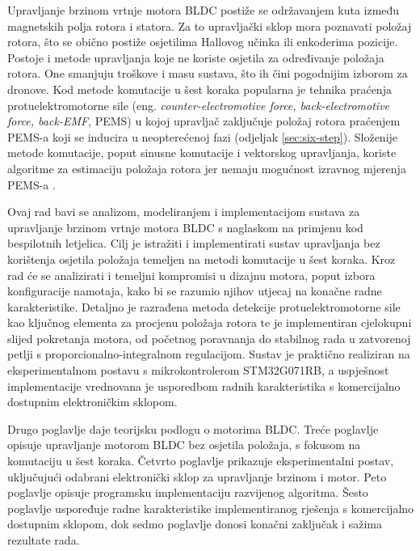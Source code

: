 \documentclass[diplomskirad]{fer}
\begin{document}
Upravljanje brzinom vrtnje motora BLDC postiže se održavanjem kuta između
magnetskih polja rotora i statora. Za to upravljački sklop mora poznavati
položaj rotora, što se obično postiže osjetilima Hallovog učinka ili enkoderima
pozicije. Postoje i metode upravljanja koje ne koriste osjetila za određivanje
položaja rotora. One smanjuju troškove i masu sustava, što ih čini pogodnijim
izborom za dronove. Kod metode komutacije u šest koraka popularna je tehnika
praćenja protuelektromotorne sile (eng. \textit {counter-electromotive force,
	back-electromotive force, back-EMF}, PEMS) u kojoj upravljač zaključuje položaj
rotora praćenjem PEMS-a koji se inducira u neopterećenoj fazi (odjeljak
\ref{sec:six-step}). Složenije metode komutacije, poput sinusne komutacije i
vektorskog upravljanja, koriste algoritme za estimaciju položaja rotora jer
nemaju mogućnost izravnog mjerenja PEMS-a \cite{NXP_AN2355}.


Ovaj rad bavi se analizom, modeliranjem i implementacijom sustava za
upravljanje brzinom vrtnje motora BLDC s naglaskom na primjenu kod bespilotnih
letjelica. Cilj je istražiti i implementirati sustav upravljanja bez korištenja
osjetila položaja temeljen na metodi komutacije u šest koraka. Kroz rad će se
analizirati i temeljni kompromisi u dizajnu motora, poput izbora konfiguracije
namotaja, kako bi se razumio njihov utjecaj na konačne radne karakteristike.
Detaljno je razrađena metoda detekcije protuelektromotorne sile kao ključnog
elementa za procjenu položaja rotora te je implementiran cjelokupni slijed
pokretanja motora, od početnog poravnanja do stabilnog rada u zatvorenoj petlji
s proporcionalno-integralnom regulacijom. Sustav je praktično realiziran na
eksperimentalnom postavu s mikrokontrolerom STM32G071RB, a uspješnost
implementacije vrednovana je usporedbom radnih karakteristika s komercijalno
dostupnim elektroničkim sklopom.

Drugo poglavlje daje teorijsku podlogu o motorima BLDC. Treće poglavlje opisuje
upravljanje motorom BLDC bez osjetila položaja, s fokusom na komutaciju u šest
koraka. Četvrto poglavlje prikazuje eksperimentalni postav, uključujući
odabrani elektronički sklop za upravljanje brzinom i motor. Peto poglavlje
opisuje programsku implementaciju razvijenog algoritma. Šesto poglavlje
uspoređuje radne karakteristike implementiranog rješenja s komercijalno
dostupnim sklopom, dok sedmo poglavlje donosi konačni zaključak i sažima
rezultate rada.
\end{document}
